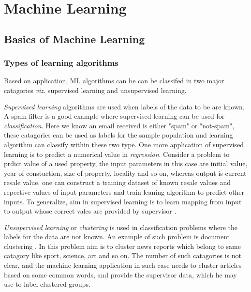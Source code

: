 \chapter{Machine Learning}
\label{chap:chapter3}


\section{Basics of Machine Learning}
\label{sec:c3basics}

\subsection{Types of learning algorithms}
Based on application, ML algorithms can be can be classifed in two major catagories \emph{viz.} supervised learning and unsupervised learning. 

\emph{Supervised learning} algorithms are used when labels of the data to be are known. A spam filter is a good example where supervised learning can be used for \emph{classification}. Here we know an email received is either "spam" or "not-spam", these catagories can be used as labels for the sample population and learning algorithm can classify within these two type.  One more application of supervised learning is to predict a numerical value in \emph{regression}. Consider a problem to prdict value of a used property, the input parameters in this case are initial value, year of constuction, size of property, locality and so on, whereas output is current resale value. one can construct a training dataset of known resale values and repective values of input parameters and train leaning algorithm to predict other inputs. To generalize, aim in supervised learning is to learn mapping from input to output whose correct vales are provided by supervisor \cite{Alpaydin2004}.

\emph{Unsupervised learning} or \emph{clustering} is used in classification problems where the labels for the data are not known. An example of such problem is document clustering \cite{Alpaydin2004}. In this problem aim is to cluster news reports which belong to same catagory like sport, science, art and so on. The number of such catagories is not clear, and the machine learning application in such case needs to cluster articles based on some common words, and provide the supervisor data, which he may use to label clustered groups.

